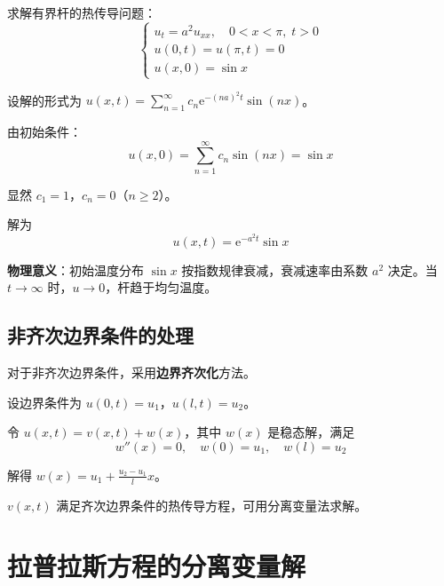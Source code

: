\begin{lizi}{}{}
求解有界杆的热传导问题：
\begin{equation}
    \begin{cases}
        u_t = a^2 u_{xx}, \quad 0 < x < \pi, \; t > 0 \\
        u(0, t) = u(\pi, t) = 0 \\
        u(x, 0) = \sin x
    \end{cases}
\end{equation}

\begin{jie}
    设解的形式为 $u(x, t) = \sum_{n=1}^{\infty} c_n\mathrm{e}^{-(na)^2 t}\sin(nx)$。

    由初始条件：
    \begin{equation}
        u(x, 0) = \sum_{n=1}^{\infty} c_n\sin(nx) = \sin x
    \end{equation}

    显然 $c_1 = 1$，$c_n = 0$（$n \geq 2$）。

    解为
    \begin{equation}
        u(x, t) = \mathrm{e}^{-a^2 t}\sin x
    \end{equation}

    \textbf{物理意义}：初始温度分布 $\sin x$ 按指数规律衰减，衰减速率由系数 $a^2$ 决定。当 $t \to \infty$ 时，$u \to 0$，杆趋于均匀温度。
\end{jie}
\end{lizi}

\subsection{非齐次边界条件的处理}

对于非齐次边界条件，采用\textbf{边界齐次化}方法。

设边界条件为 $u(0, t) = u_1$，$u(l, t) = u_2$。

令 $u(x, t) = v(x, t) + w(x)$，其中 $w(x)$ 是稳态解，满足
\begin{equation}
    w''(x) = 0, \quad w(0) = u_1, \quad w(l) = u_2
\end{equation}

解得 $w(x) = u_1 + \frac{u_2 - u_1}{l}x$。

$v(x, t)$ 满足齐次边界条件的热传导方程，可用分离变量法求解。

\section{拉普拉斯方程的分离变量解}

